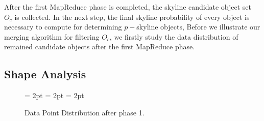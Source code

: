 After the first MapReduce phase is completed, the skyline candidate object set $O_c$ is collected. In the next step, the final skyline probability of every object is necessary to compute for determining $p-$skyline objects,  Before we illustrate our merging algorithm for filtering $O_c$, we firstly study the data distribution of remained candidate objects after the first MapReduce phase.

\subsection{Shape Analysis}

\begin{figure}[!t]
    \begin{center}
    \vspace{-1.5pc}
  \subfigbottomskip = 2pt 
    \hspace{0.01em}
  \subfigbottomskip = 2pt  
    \hspace{0.01em}
  \subfigbottomskip = 2pt  

    \caption{Data Point Distribution after phase 1.}
    \label{fig:shape}
    \end{center}
\vspace{-10pt}
\end{figure}

